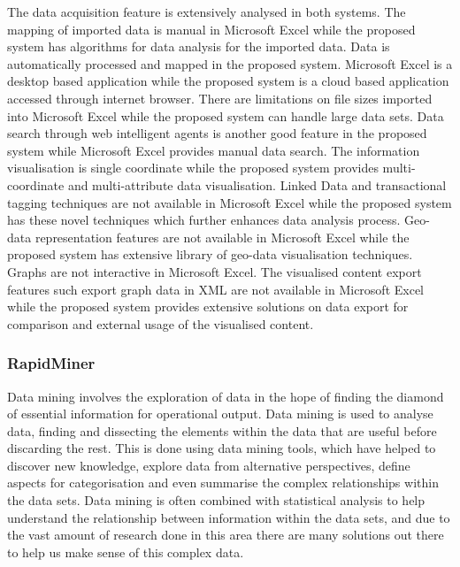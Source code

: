 The data acquisition feature is extensively analysed in both systems. The mapping of imported data is manual in Microsoft Excel while the proposed system has algorithms for data analysis for the imported data. Data is automatically processed and mapped in the proposed system. Microsoft Excel is a desktop based application while the proposed system is a cloud based application accessed through internet browser. There are limitations on file sizes imported into Microsoft Excel while the proposed system can handle large data sets. Data search through web intelligent agents is another good feature in the proposed system while Microsoft Excel provides manual data search. The information visualisation is single coordinate while the proposed system provides multi-coordinate and multi-attribute data visualisation. Linked Data and transactional tagging techniques are not available in Microsoft Excel while the proposed system has these novel techniques which further enhances data analysis process. Geo-data representation features are not available in Microsoft Excel while the proposed system has extensive library of geo-data visualisation techniques. Graphs are not interactive in Microsoft Excel. The visualised content export features such export graph data in XML are not available in Microsoft Excel while the proposed system provides extensive solutions on data export for comparison and external usage of the visualised content.



\subsubsection{RapidMiner}

Data mining involves the exploration of data in the hope of finding the diamond of essential information for operational output. Data mining is used to analyse data, finding and dissecting the elements within the data that are useful before discarding the rest. This is done using data mining tools, which have helped to discover new knowledge, explore data from alternative perspectives, define aspects for categorisation and even summarise the complex relationships within the data sets. Data mining is often combined with statistical analysis to help understand the relationship between information within the data sets, and due to the vast amount of research done in this area there are many solutions out there to help us make sense of this complex data.

